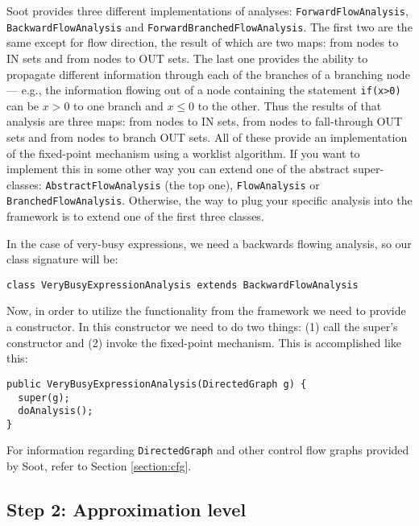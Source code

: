\documentclass{article}
\newcommand{\code}[1]{\texttt{\small #1}}
\begin{document}
Soot provides three different implementations of analyses:
\code{ForwardFlowAnalysis}, \code{BackwardFlowAnalysis} and
\code{ForwardBranchedFlowAnalysis}. The first two are the same except
for flow direction, the result of which are two maps: from nodes to IN
sets and from nodes to OUT sets. The last one provides the ability to
propagate different information through each of the branches of a
branching node --- e.g., the information flowing out of a node
containing the statement \code{if(x>0)} can be $x>0$ to one branch and
$x\leq0$ to the other. Thus the results of that analysis are three
maps: from nodes to IN sets, from nodes to fall-through OUT sets and
from nodes to branch OUT sets.  All of these provide an implementation
of the fixed-point mechanism using a worklist algorithm. If you want
to implement this in some other way you can extend one of the abstract
super-classes: \code{AbstractFlowAnalysis} (the top one),
\code{FlowAnalysis} or \code{BranchedFlowAnalysis}. Otherwise, the way
to plug your specific analysis into the framework is to extend one of
the first three classes.

In the case of very-busy expressions, we need a backwards flowing
analysis, so our class signature will be:

\begin{center}
  \begin{minipage}{0.9 \linewidth}
    \begin{verbatim}
class VeryBusyExpressionAnalysis extends BackwardFlowAnalysis
    \end{verbatim}
  \end{minipage}
\end{center}
Now, in order to utilize the functionality from the framework we need
to provide a constructor. In this constructor we need to do two
things: (1) call the super's constructor and (2) invoke the
fixed-point mechanism. This is accomplished like this:
\begin{center}
  \begin{minipage}{0.9 \linewidth}
    \begin{verbatim}
public VeryBusyExpressionAnalysis(DirectedGraph g) {
  super(g);
  doAnalysis();
}
    \end{verbatim}
  \end{minipage}
\end{center}
For information regarding \code{DirectedGraph} and other control flow
graphs provided by Soot, refer to Section \ref{section:cfg}.

\subsection{Step 2: Approximation level}
\end{document}
